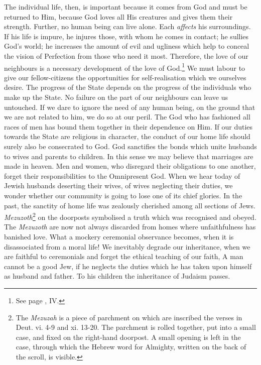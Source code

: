 The individual life, then, is important because
it comes from God and must be returned
to Him, because God loves all His
creatures and gives them their strength.
Further, no human being can live alone.
Each \textsl{affects} his surroundings. If his life is
impure, he injures those, with whom he
comes in contact; he sullies God’s world; he
increases the amount of evil and ugliness
which help to conceal the vision of Perfection
from those who need it most.
Therefore, the love of our neighbours is a
necessary development of the love of God.\footnote{See
page \pageref{love}, IV.}
We must labour to give our fellow-citizens
the opportunities for self-realisation which
we ourselves desire. The progress of the
State depends on the progress of the individuals
who make up the State. No failure
on the part of our neighbours can leave us
untouched. If we dare to ignore the need
of any human being, on the ground that we
are not related to him, we do so at our
peril. The God who has fashioned all
races of men has bound them together
in their dependence on Him. If our
duties towards the State are religious in
character, the conduct of our home life
should surely also be consecrated to God.
God sanctifies the bonds which unite
husbands to wives and parents to children.
In this sense we may believe that marriages
are made in heaven. Men and
women, who disregard their obligations to
one another, forget their responsibilities to
the Omnipresent God. When we hear today
of Jewish husbands deserting their
wives, of wives neglecting their duties,
we wonder whether our community is
going to lose one of its chief glories. In
the past, the sanctity of home life was
zealously cherished among all sections of
Jews. \textsl{Mezuzoth}\footnote{The \textsl{Mezuzah}
is a piece of parchment on which are inscribed
the verses in Deut. vi. 4-9 and xi. 13-20. The parchment
is rolled together, put into a small case, and fixed on
the right-hand doorpost. A small opening is left in the case,
through which the Hebrew word for Almighty, written on the
back of the scroll, is visible.}
on the doorposts symbolised
a truth which was recognised and
obeyed. The \textsl{Mezuzoth} are now not always
discarded from homes where unfaithfulness
has banished love. What a mockery ceremonial
observance becomes, when it is
disassociated from a moral life! We inevitably
degrade our inheritance, when we
are faithful to ceremonials and forget the
ethical teaching of our faith, A man
cannot be a good Jew, if he neglects the
duties which he has taken upon himself
as husband and father. To his children
the inheritance of Judaism passes.

